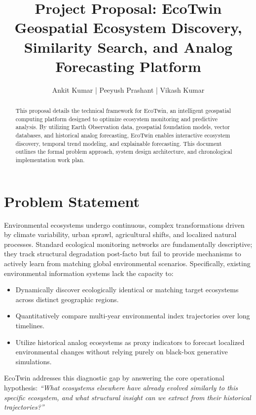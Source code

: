 \documentclass[11pt,a4paper]{article}
\title{
    \textbf{Project Proposal: EcoTwin} \\
    \large Geospatial Ecosystem Discovery, Similarity Search, and Analog Forecasting Platform
}
\author{
    Ankit Kumar | Peeyush Prashant | Vikash Kumar \\
}
\date{}
\begin{document}
\maketitle

\begin{abstract}
This proposal details the technical framework for EcoTwin, an intelligent geospatial computing platform designed to optimize ecosystem monitoring and predictive analysis. By utilizing Earth Observation data, geospatial foundation models, vector databases, and historical analog forecasting, EcoTwin enables interactive ecosystem discovery, temporal trend modeling, and explainable forecasting. This document outlines the formal problem approach, system design architecture, and chronological implementation work plan.
\end{abstract}

\tableofcontents
\newpage

\section{Problem Statement}
Environmental ecosystems undergo continuous, complex transformations driven by climate variability, urban sprawl, agricultural shifts, and localized natural processes. Standard ecological monitoring networks are fundamentally descriptive; they track structural degradation post-facto but fail to provide mechanisms to actively learn from matching global environmental scenarios. Specifically, existing environmental information systems lack the capacity to:
\begin{itemize}
    \item Dynamically discover ecologically identical or matching target ecosystems across distinct geographic regions.
    \item Quantitatively compare multi-year environmental index trajectories over long timelines.
    \item Utilize historical analog ecosystems as proxy indicators to forecast localized environmental changes without relying purely on black-box generative simulations.
\end{itemize}

EcoTwin addresses this diagnostic gap by answering the core operational hypothesis: \textit{``What ecosystems elsewhere have already evolved similarly to this specific ecosystem, and what structural insight can we extract from their historical trajectories?''}
\end{document}
